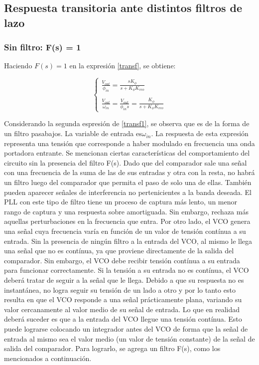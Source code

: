 \subsection{Respuesta transitoria ante distintos filtros de lazo}

	\subsubsection{Sin filtro: F(s) = 1 }
	Haciendo $F(s) = 1$ en la expresi\'on \ref{transf}, se obtiene:
	
\begin{equation}
\begin{cases}
\frac{V_{out}}{\phi_{in}} = \frac{sK_{\phi}}{s+K_{\phi}K_{vco}}\\ \\
\frac{V_{out}}{\omega_{in}}=\frac{V_{out}}{\phi_{in}s} = \frac{K_{\phi}}{s+K_{\phi}K_{vco}}
\end{cases}
\label{transf1}
\end{equation}

Considerando la segunda espresi\'on de \ref{transf1}, se observa que es de la forma de un filtro pasabajos. La variable de entrada es$\omega_{in}$. La respuesta de esta expresi\'on representa una tensi\'on que corresponde a haber modulado en frecuencia una onda portadora entrante.
Se mencionan ciertas caracter\'isticas del comportamiento del circuito sin la presencia del filtro F(s). Dado que del comparador sale una señal con una frecuencia de la suma de las de sus entradas y otra con la resta, no habr\'a un filtro luego del comparador que permita el paso de solo una de ellas. Tambi\'en pueden aparecer señales de interferencia no pertenicientes a la banda deseada. El PLL con este tipo de filtro tiene un proceso de captura m\'as lento, un menor rango de captura y una respuesta sobre amortiguada. Sin embargo, rechaza m\'as aquellas perturbaciones en la frecuencia que entra.
Por otro lado, el VCO genera una señal cuya frecuencia var\'ia en funci\'on de un valor de tensi\'on cont\'inua a su entrada. Sin la presencia de ning\'un filtro a la entrada del VCO, al mismo le llega una señal que no es cont\'inua, ya que proviene directamente de la salida del comparador. Sin embargo, el VCO debe recibir tensi\'on cont\'inua a su entrada para funcionar correctamente. Si la tensi\'on a su entrada no es cont\'inua, el VCO deber\'a tratar de seguir a la señal que le llega. Debido a que su respuesta no es instant\'anea, no logra seguir su tensi\'on de un lado a otro y por lo tanto esto resulta en que el VCO responde a una señal pr\'acticamente plana, variando su valor cercanamente al valor medio de su señal de entrada. Lo que en realidad deber\'a suceder es que a la entrada del VCO llegue una tensi\'on cont\'inua. Esto puede lograrse colocando un integrador antes del VCO de forma que la señal de entrada al mismo sea el valor medio (un valor de tensi\'on constante) de la señal de salida del comparador. Para lograrlo, se agrega un filtro F(s), como los mencionados a continuaci\'on.
		
